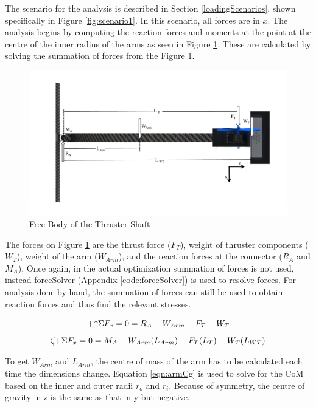 \documentclass[../main.tex]{subfiles}
\begin{document}
The scenario for the analysis is described in Section \ref{loadingScenarios}, shown specifically in Figure \ref{fig:scenario1}. In this scenario, all forces are in $x$. The analysis begins by computing the reaction forces and moments at the point at the centre of the inner radius of the arms as seen in Figure \ref{fig:thrusterArmFBD}. These are calculated by solving the summation of forces from the Figure \ref{fig:thrusterArmFBD}.

\begin{figure}[H]
	\centering
	\includegraphics[width=.9\linewidth]{img/analysis/arm/thrusterArm.pdf}
	\caption{Free Body of the Thruster Shaft}
	\label{fig:thrusterArmFBD}
\end{figure}

The forces on Figure \ref{fig:thrusterArmFBD} are the thrust force ($F_T$), weight of thruster components ($W_T$), weight of the arm ($W_{Arm}$), and the reaction forces at the connector ($R_A$ and $M_A$). Once again, in the actual optimization summation of forces is not used, instead forceSolver (Appendix \ref{code:forceSolver}) is used to resolve forces. For analysis done by hand, the summation of forces can still be used to obtain reaction forces and thus find the relevant stresses.

\begin{equation} \label{eqn:armFx}
\mathbin{+\mathord\uparrow} \Sigma F_x = 0 = R_A - W_{Arm} - F_T - W_T
\end{equation}
\begin{equation} \label{eqn:armMA}
\curveplus \Sigma F_x = 0 = M_A - W_{Arm}(L_{Arm}) - F_T(L_T) - W_T(L_{WT})
\end{equation}

To get $W_{Arm}$ and $L_{Arm}$, the centre of mass of the arm has to be calculated each time the dimensions change. Equation \ref{eqn:armCg} is used to solve for the CoM based on the inner and outer radii $r_o$ and $r_i$. Because of symmetry, the centre of gravity in z is the same as that in y but negative. 
\end{document}
